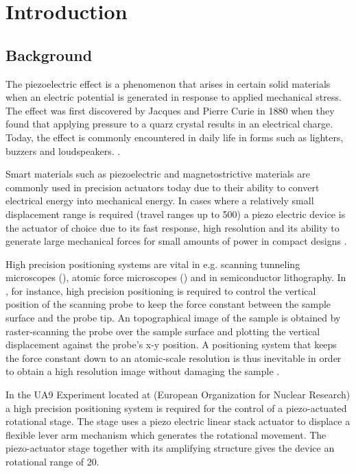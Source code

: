\chapter{Introduction}\label{cha:intro}

\section{Background}
The piezoelectric effect is a phenomenon that arises in certain solid materials when an electric potential is generated in response to applied mechanical stress. The effect was first discovered by Jacques and Pierre Curie in 1880 when they found that applying pressure to a quarz crystal results in an electrical charge. Today, the effect is commonly encountered in daily life in forms such as lighters, buzzers and loudspeakers.  \citep{SurveyOfControlIssues:2007} \citep{Piezo:2008}.

Smart materials such as piezoelectric and magnetostrictive materials are commonly used in precision actuators today due to their ability to convert electrical energy into mechanical energy. In cases where a relatively small displacement range is required (travel ranges up to \unit{500}{\micro\meter}) a piezo electric device is the actuator of choice due to its fast response, high resolution and its ability to generate large mechanical forces for small amounts of power in compact designs \citep{SurveyOfControlIssues:2007}.

High precision positioning systems are vital in e.g. scanning tunneling microscopes (\abbrSTM), atomic force microscopes (\abbrAFM) and in semiconductor lithography. In \abbrAFM, for instance, high precision positioning is required to control the vertical position of the scanning probe to keep the force constant between the sample surface and the probe tip. An topographical image of the sample is obtained by raster-scanning the probe over the sample surface and plotting the vertical displacement against the probe's x-y position. A positioning system that keeps the force constant down to an atomic-scale resolution is thus inevitable in order to obtain a high resolution image without damaging the sample \cite{SurveyOfControlIssues:2007}.

In the UA9 Experiment located at \abbrCERN (European Organization for Nuclear Research) a high precision positioning system is required for the control of a piezo-actuated rotational stage. The stage uses a piezo electric linear stack actuator to displace a flexible lever arm mechanism which generates the rotational movement. The piezo-actuator stage together with its amplifying structure gives the device an rotational range of \unit{20}{\milli\rad}.

